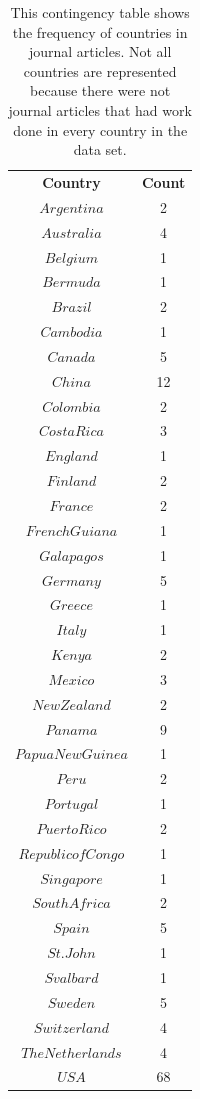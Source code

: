 \documentclass[12pt, letterpaper]{article}
\begin{document}
\begin{table}[h]
\begin{center}
\begin{tabular}{|c|c|}
\textbf{Country} & \textbf{Count}\\
$Argentina$ & 2\\
$Australia$ & 4\\
$Belgium$ & 1\\
$Bermuda$ & 1\\
$Brazil$ & 2\\
$Cambodia$ & 1\\
$Canada$ & 5\\
$China$ & 12\\
$Colombia$ & 2\\
$Costa Rica$ & 3\\
$England$ & 1\\
$Finland$ & 2\\
$France$ & 2\\
$French Guiana$ & 1\\
$Galapagos$ & 1\\
$Germany$ &  5\\
$Greece$ &  1\\
$Italy$ & 1\\
$Kenya$ & 2\\
$Mexico$ & 3\\
$New Zealand$ & 2\\
$Panama$ & 9\\
$Papua New Guinea$ &  1\\
$Peru$ &  2\\
$Portugal$ & 1\\
$Puerto Rico$ & 2\\
$Republic of Congo$ & 1\\
$Singapore$ & 1\\
$South Africa$ & 2\\
$Spain$ &  5\\
$St. John$ &  1\\
$Svalbard$ & 1\\
$Sweden$ & 5\\
$Switzerland$ & 4\\
$The Netherlands$ & 4\\
$USA$ & 68\\
\end{tabular}
\end{center}
\caption{This contingency table shows the frequency of countries in journal articles. Not all countries are represented because there were not journal articles that had work done in every country in the data set.}
\label{fig: Contingency Table for Country}
\end{table}
\end{document}
